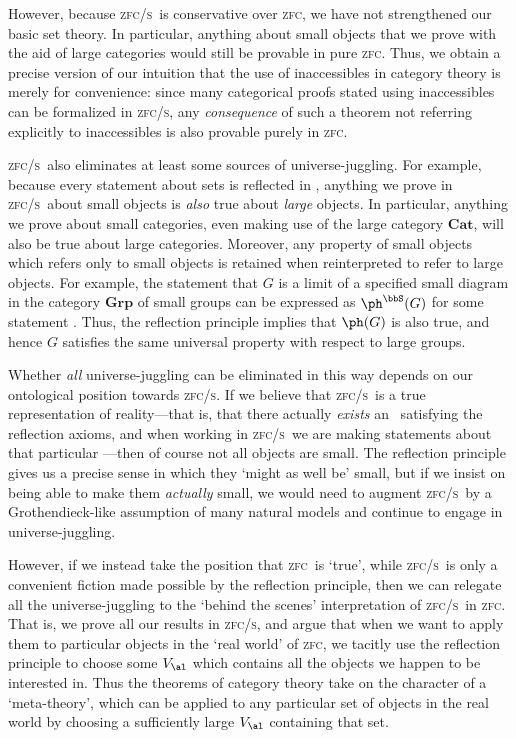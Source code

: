 \documentclass[12pt]{amsart}
\def\zfc{\textsc{zfc}}
\def\zfcs{\textsc{zfc/s}}
\begin{document}
However, because \zfcs\ is conservative over \zfc, we have not
strengthened our basic set theory.  In particular, anything about
small objects that we prove with the aid of large categories would
still be provable in pure \zfc.  Thus, we obtain a precise version of
our intuition that the use of inaccessibles in category theory is
merely for convenience: since many categorical proofs stated using
inaccessibles can be formalized in \zfcs, any \emph{consequence} of
such a theorem not referring explicitly to inaccessibles is also
provable purely in \zfc.

\zfcs\ also eliminates at least some sources of universe-juggling.
For example, because every statement about sets is reflected in \bbS,
anything we prove in \zfcs\ about small objects is \emph{also} true
about \emph{large} objects.  In particular, anything we prove about
small categories, even making use of the large category
$\mathbf{Cat}$, will also be true about large categories.  Moreover,
any property of small objects which refers only to small objects is
retained when reinterpreted to refer to large objects.  For example,
the statement that $G$ is a limit of a specified small diagram in the
category $\mathbf{Grp}$ of small groups can be expressed as
$\ph^\bbS(G)$ for some statement \ph.  Thus, the reflection principle
implies that $\ph(G)$ is also true, and hence $G$ satisfies the same
universal property with respect to large groups.

Whether \emph{all} universe-juggling can be eliminated in this way
depends on our ontological position towards \zfcs.  If we believe that
\zfcs\ is a true representation of reality---that is, that there
actually \emph{exists} an \bbS\ satisfying the reflection axioms, and
when working in \zfcs\ we are making statements about that particular
\bbS---then of course not all objects are small.  The reflection
principle gives us a precise sense in which they `might as well be'
small, but if we insist on being able to make them \emph{actually}
small, we would need to augment \zfcs\ by a Grothendieck-like
assumption of many natural models and continue to engage in
universe-juggling.

However, if we instead take the position that \zfc\ is `true', while
\zfcs\ is only a convenient fiction made possible by the reflection
principle, then we can relegate all the universe-juggling to the
`behind the scenes' interpretation of \zfcs\ in \zfc.  That is, we
prove all our results in \zfcs, and argue that when we want to apply
them to particular objects in the `real world' of \zfc, we tacitly use
the reflection principle to choose some $V_\al$ which contains all the
objects we happen to be interested in.  Thus the theorems of category
theory take on the character of a `meta-theory', which can be applied
to any particular set of objects in the real world by choosing a
sufficiently large $V_\al$ containing that set.
\end{document}
